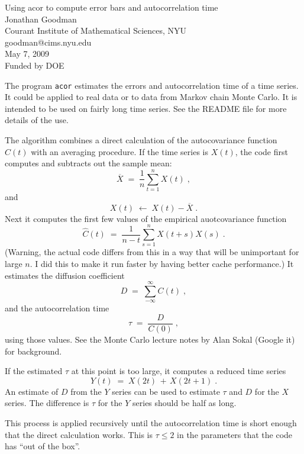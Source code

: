 \documentclass{article}
\begin{document}
\begin{center}
\Large
Using acor to compute error bars and autocorrelation time\\
\normalsize
Jonathan Goodman\\
Courant Institute of Mathematical Sciences, NYU\\
goodman@cims.nyu.edu\\
May 7, 2009\\
Funded by DOE\\
\end{center}

The program {\tt acor} estimates the errors and autocorrelation time of a time series.
It could be applied to real data or to data from Markov chain Monte Carlo.
It is intended to be used on fairly long time series.
See the README file for more details of the use.

The algorithm combines a direct calculation of the autocovariance function $C(t)$
with an averaging procedure.
If the time series is $X(t)$, the code first computes and subtracts out the 
sample mean: 
$$
\overline{X} \;=\; \frac{1}{n} \sum_{t=1}^n X(t) \; ,
$$
and
$$ 
X(t) \;\leftarrow \; X(t) - \overline{X} \; .
$$
Next it computes the first few values of the empirical auotcovariance function
$$
\widehat{C}(t) \;=\; \frac{1}{n-t} \sum_{s=1}^n X(t+s)X(s) \; .
$$
(Warning, the actual code differs from this in a way that will be unimportant
for large $n$.  I did this to make it run faster by having better cache performance.)
It estimates the diffusion coefficient
$$
D \;=\; \sum_{-\infty}^{\infty} C(t) \; ,
$$
and the autocorrelation time
$$
\tau \;=\; \frac{D}{C(0)} \; ,
$$
using those values.
See the Monte Carlo lecture notes by Alan Sokal (Google it) for background.

If the estimated $\tau$ at this point is too large, it computes a reduced time series
$$
Y(t) \;=\; X(2t) \,+\, X(2t+1) \; .
$$
An estimate of $D$ from the $Y$ series can be used to estimate $\tau$ and $D$ for the 
$X$ series.
The difference is $\tau$ for the $Y$ series should be half as long.

This process is applied recursively until the autocorrelation time is short enough
that the direct calculation works.  
This is $\tau \leq 2$ in the parameters that the code has ``out of the box''.
\end{document}
